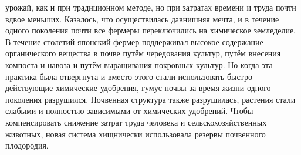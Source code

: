 \documentclass[a4paper]{book}
\begin{document}
урожай, как и при традиционном методе, но при затратах времени и труда почти вдвое
меньших. Казалось, что осуществилась давнишняя мечта, и в течение одного поколения
почти все фермеры переключились на химическое земледелие.
В течение столетий японский фермер поддерживал высокое содержание органического
вещества в почве путём чередования культур, путём внесения компоста и навоза и путём
выращивания покровных культур. Но когда эта практика была отвергнута и вместо этого
стали использовать быстро действующие химические удобрения, гумус почвы за время
жизни одного поколения разрушился. Почвенная структура также разрушилась, растения
стали слабыми и полностью зависимыми от химических удобрений. Чтобы компенсировать
снижение затрат труда человека и сельскохозяйственных животных, новая система
хищнически использовала резервы почвенного плодородия.
\end{document}
